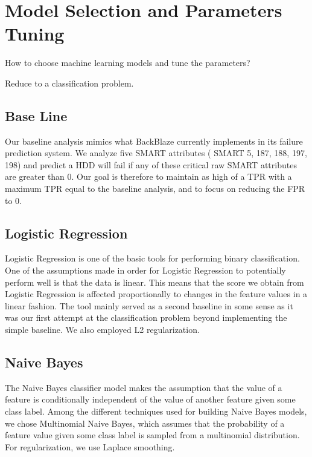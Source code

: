 \documentclass[12pt,a4paper,english]{amsart}
\begin{document}
\section{Model Selection and Parameters Tuning}

How to choose machine learning models and tune the parameters?

Reduce to a classification problem.

\subsection*{Base Line}

Our baseline analysis mimics what BackBlaze currently implements in its failure prediction system. We analyze five SMART attributes ( SMART 5, 187, 188, 197, 198) and predict a HDD will fail if any of these critical raw SMART   attributes   are   greater   than   0.
Our goal is therefore to maintain as high of a TPR with a maximum TPR equal to the baseline analysis, and to focus   on   reducing   the   FPR   to   0.

\subsection*{Logistic Regression}

Logistic Regression is one of the basic tools for performing binary classification. One of the assumptions made in order for Logistic Regression to potentially perform well is that the data is linear. This means that the score we obtain from Logistic Regression is affected proportionally to changes in the feature values in a linear fashion. The tool mainly served as a second baseline in some sense as it was our first attempt at the classification problem beyond implementing   the   simple   baseline.   We   also   employed   L2   regularization.

\subsection*{Naive Bayes}

The Naive Bayes classifier model makes the assumption that the value of a feature is conditionally independent of the value of another feature given some class label. Among the different techniques used for building Naive Bayes models, we chose Multinomial Naive Bayes, which assumes that the probability of a feature value given some class label   is   sampled   from   a   multinomial   distribution.   For   regularization,   we   use   Laplace   smoothing.
\end{document}
